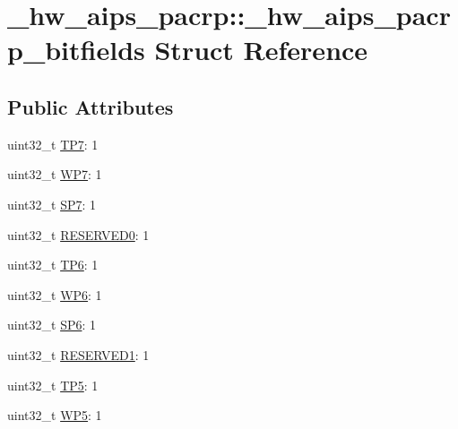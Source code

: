\hypertarget{struct__hw__aips__pacrp_1_1__hw__aips__pacrp__bitfields}{}\section{\+\_\+hw\+\_\+aips\+\_\+pacrp\+:\+:\+\_\+hw\+\_\+aips\+\_\+pacrp\+\_\+bitfields Struct Reference}
\label{struct__hw__aips__pacrp_1_1__hw__aips__pacrp__bitfields}
\subsection*{Public Attributes}
\begin{DoxyCompactItemize}
\item 
uint32\+\_\+t \hyperlink{struct__hw__aips__pacrp_1_1__hw__aips__pacrp__bitfields_a189569638ee9d26af43fd143bd5a4588}{T\+P7}\+: 1
\item 
uint32\+\_\+t \hyperlink{struct__hw__aips__pacrp_1_1__hw__aips__pacrp__bitfields_a5dea1a3f146d3a8af9dad264db3874c7}{W\+P7}\+: 1
\item 
uint32\+\_\+t \hyperlink{struct__hw__aips__pacrp_1_1__hw__aips__pacrp__bitfields_a4ec041bd2c15e3d6ad6da9eb32c80daf}{S\+P7}\+: 1
\item 
uint32\+\_\+t \hyperlink{struct__hw__aips__pacrp_1_1__hw__aips__pacrp__bitfields_a97af2a05a4e3322226e520adbe61d14b}{R\+E\+S\+E\+R\+V\+E\+D0}\+: 1
\item 
uint32\+\_\+t \hyperlink{struct__hw__aips__pacrp_1_1__hw__aips__pacrp__bitfields_ad7227a53dd9014950222fafb977e27a8}{T\+P6}\+: 1
\item 
uint32\+\_\+t \hyperlink{struct__hw__aips__pacrp_1_1__hw__aips__pacrp__bitfields_ae4393ddca4bf1016b878be74e2464809}{W\+P6}\+: 1
\item 
uint32\+\_\+t \hyperlink{struct__hw__aips__pacrp_1_1__hw__aips__pacrp__bitfields_aa5daedc2bc99c400c3d47ea3fe2517dd}{S\+P6}\+: 1
\item 
uint32\+\_\+t \hyperlink{struct__hw__aips__pacrp_1_1__hw__aips__pacrp__bitfields_af738b9a16bb897979fc2ef8c37b00930}{R\+E\+S\+E\+R\+V\+E\+D1}\+: 1
\item 
uint32\+\_\+t \hyperlink{struct__hw__aips__pacrp_1_1__hw__aips__pacrp__bitfields_af52555bf4bfb8d9619fee46b621bf8e0}{T\+P5}\+: 1
\item 
uint32\+\_\+t \hyperlink{struct__hw__aips__pacrp_1_1__hw__aips__pacrp__bitfields_a0f3d787c5b6e65eae7b37b1f4af1366a}{W\+P5}\+: 1

\end{DoxyCompactItemize}

